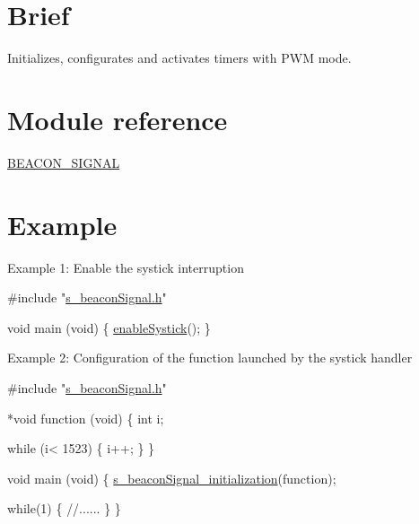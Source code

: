 \hypertarget{beacon_signal_BEACON_SIGNAL_intro}{}\section{Brief}\label{beacon_signal_BEACON_SIGNAL_intro}
Initializes, configurates and activates timers with P\+W\+M mode.\hypertarget{beacon_signal_BEACON_SIGNAL_reference}{}\section{Module reference}\label{beacon_signal_BEACON_SIGNAL_reference}

\begin{DoxyItemize}
\item \hyperlink{group__beacon_signal___module}{B\+E\+A\+C\+O\+N\+\_\+\+S\+I\+G\+N\+A\+L}
\end{DoxyItemize}\hypertarget{beacon_signal_BEACON_SIGNAL_exemples}{}\section{Example}\label{beacon_signal_BEACON_SIGNAL_exemples}
Example 1\+: Enable the systick interruption


\begin{DoxyCode}
\textcolor{preprocessor}{#include "\hyperlink{s__beacon_signal_8h}{s\_beaconSignal.h}"}

\textcolor{keywordtype}{void} main (\textcolor{keywordtype}{void})
\{
 \hyperlink{group__beacon_signal___function_ga90346dc49f0a8f6eeaaab8a26f3a22b5}{enableSystick}();
\}
\end{DoxyCode}


Example 2\+: Configuration of the function launched by the systick handler


\begin{DoxyCode}
\textcolor{preprocessor}{  #include "\hyperlink{s__beacon_signal_8h}{s\_beaconSignal.h}"}
  
*\textcolor{keywordtype}{void} \textcolor{keyword}{function} (void)
 \{
    \textcolor{keywordtype}{int} i;
    
    \textcolor{keywordflow}{while} (i< 1523)
    \{
        i++;
        \}
 \}
 
  \textcolor{keywordtype}{void} main (\textcolor{keywordtype}{void})
  \{
    \hyperlink{group__beacon_signal___function_gacbfa3327cc59cede48c905ac55acebbf}{s\_beaconSignal\_initialization}(\textcolor{keyword}{function});
 
     \textcolor{keywordflow}{while}(1)
        \{
        \textcolor{comment}{//......}
    \}
 \}
\end{DoxyCode}
 